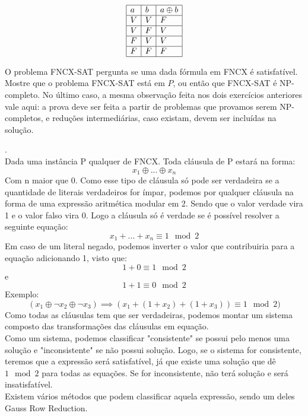 \documentclass[12pt]{article}
\newcommand{\resposta}[1]{ \noindent {\bf Solução}.{\color{blue} #1}}
\begin{document}
\begin{enumerate}
  $$\begin{array}{|l|l|l|}\hline
      a & b & a \oplus b \\ \hline
      V & V & F \\ \hline
      V & F & V \\ \hline
      F & V & V \\ \hline
      F & F & F \\ \hline
  \end{array}$$

  O problema FNCX-SAT pergunta se uma dada fórmula em FNCX é
  satisfatível. Mostre que o problema FNCX-SAT está em $P$, ou então
  que FNCX-SAT é NP-completo. No último caso, a mesma observação feita
  nos dois exercícios anteriores vale aqui: a prova deve ser feita a
  partir de problemas que provamos serem NP-completos, e reduções
  intermediárias, caso existam, devem ser incluídas na solução.

  \resposta{
    \\Dada uma instância P qualquer de FNCX. Toda cláusula de P estará na forma:
        $$x_1 \oplus ... \oplus x_n$$ 
    Com n maior que 0. Como esse tipo de cláusula só pode ser verdadeira se a quantidade de literais verdadeiros for ímpar, podemos por qualquer cláusula na forma de uma expressão aritmética modular em 2. Sendo que o valor verdade vira 1 e o valor falso vira 0. Logo a cláusula só é verdade se é possível resolver a seguinte equação: 
        $$x_1 + ... + x_n \equiv  1 \mod 2$$
    Em caso de um literal negado, podemos inverter o valor que contribuiria para a equação adicionando 1, visto que:
        $$1+0 \equiv 1  \mod 2$$ e $$1 + 1 \equiv 0 \mod 2$$
    Exemplo: 
        $$(x_1 \oplus \neg x_2 \oplus \neg x_3) \implies (x_1 + (1 + x_2) + (1 + x_3)) \equiv 1 \mod 2)$$
    Como todas as cláusulas tem que ser verdadeiras, podemos montar um sistema composto das transformações das cláusulas em equação.\\
    Como um sistema, podemos classificar "consistente" se possui pelo menos uma solução e "inconsistente" se não possui solução. Logo, se o sistema for consistente, teremos que a expressão será satisfatível, já que existe uma solução que dê $1 \mod 2$ para todas as equações. Se for inconsistente, não terá solução e será insatisfatível.\\ Existem vários métodos que podem classificar aquela expressão, sendo um deles Gauss Row Reduction.
  }
\end{enumerate}
\end{document}
